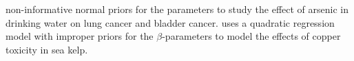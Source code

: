 non-informative normal priors for the parameters to study the effect of arsenic in drinking water on lung cancer and bladder cancer. \citet{held04} uses a quadratic regression model with improper priors for the $\beta$-parameters to model the effects of copper toxicity in sea kelp.
%
%
